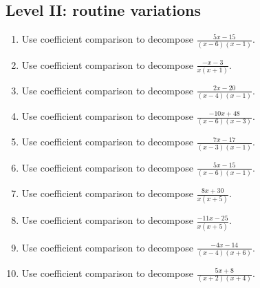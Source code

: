\documentclass[11pt,oneside]{book}
\begin{document}
\subsection*{Level II: routine variations}
\begin{enumerate}[leftmargin=*,label=\textbf{\arabic*.},itemsep=0.65\baselineskip]
\item Use coefficient comparison to decompose $\displaystyle \frac{5 x - 15}{\left(x - 6\right) \left(x - 1\right)}$.
\item Use coefficient comparison to decompose $\displaystyle \frac{- x - 3}{x \left(x + 1\right)}$.
\item Use coefficient comparison to decompose $\displaystyle \frac{2 x - 20}{\left(x - 4\right) \left(x - 1\right)}$.
\item Use coefficient comparison to decompose $\displaystyle \frac{- 10 x + 48}{\left(x - 6\right) \left(x - 3\right)}$.
\item Use coefficient comparison to decompose $\displaystyle \frac{7 x - 17}{\left(x - 3\right) \left(x - 1\right)}$.
\item Use coefficient comparison to decompose $\displaystyle \frac{5 x - 15}{\left(x - 6\right) \left(x - 1\right)}$.
\item Use coefficient comparison to decompose $\displaystyle \frac{8 x + 30}{x \left(x + 5\right)}$.
\item Use coefficient comparison to decompose $\displaystyle \frac{- 11 x - 25}{x \left(x + 5\right)}$.
\item Use coefficient comparison to decompose $\displaystyle \frac{- 4 x - 14}{\left(x - 4\right) \left(x + 6\right)}$.
\item Use coefficient comparison to decompose $\displaystyle \frac{5 x + 8}{\left(x + 2\right) \left(x + 4\right)}$.
\end{enumerate}
\end{document}
